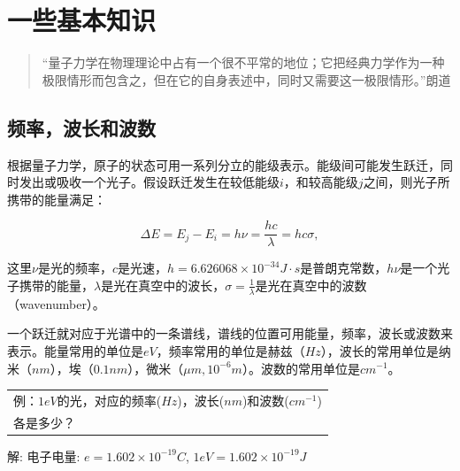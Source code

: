 \section{一些基本知识}

\begin{quotation}
“量子力学在物理理论中占有一个很不平常的地位；它把经典力学作为一种极限情形而包含之，但在它的自身表述中，同时又需要这一极限情形。”\qquad 朗道
\end{quotation}

\subsection{频率，波长和波数}

根据量子力学，原子的状态可用一系列分立的能级表示。能级间可能发生跃迁，同时发出或吸收一个光子。假设跃迁发生在较低能级$i$，和较高能级$j$之间，则光子所携带的能量满足：

\begin{equation}\label{Planck Relation}
    \Delta E = E_j - E_i = h \nu = \frac{hc}{\lambda} = hc \sigma,
\end{equation}

这里$\nu$是光的频率，$c$是光速，$h=6.626068 \times 10^{-34} J\cdot
s$是普朗克常数，$h
\nu$是一个光子携带的能量，$\lambda$是光在真空中的波长，$\sigma =
\frac{1}{\lambda}$是光在真空中的波数（wavenumber）。

一个跃迁就对应于光谱中的一条谱线，谱线的位置可用能量，频率，波长或波数来表示。能量常用的单位是$eV$，频率常用的单位是赫兹（$Hz$），波长的常用单位是纳米（$nm$），埃（$0.1nm$），微米（$\mu m ,
10^{-6}m$）。波数的常用单位是$cm^{-1}$。


\begin{center}

\begin{tabular}{|l|}
  \hline

例：$1eV$的光，对应的频率($Hz$)，波长($nm$)和波数($cm^{-1}$)\\各是多少？\\

  \hline
\end{tabular}

\end{center}

解: 电子电量: $e = 1.602 \times 10^{-19}C$, $1eV = 1.602 \times
10^{-19} J$

